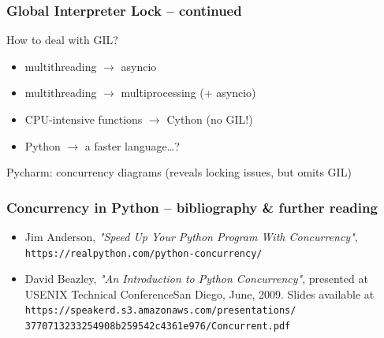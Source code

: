 \documentclass{beamer}
\begin{document}
    \begin{frame}
        \frametitle{Global Interpreter Lock -- continued}

        How to deal with GIL?
        \begin{itemize}
            \item multithreading $\rightarrow$ asyncio
            \item multithreading $\rightarrow$ multiprocessing (+ asyncio)
            \item CPU-intensive functions $\rightarrow$ Cython (no GIL!)
            \item Python $\rightarrow$ a faster language\dots?
        \end{itemize}

        Pycharm: concurrency diagrams (reveals locking issues, but omits GIL)

    \end{frame}


    \begin{frame}
        \frametitle{Concurrency in Python -- bibliography \& further reading}

        \begin{itemize}
            \item<1-> Jim Anderson, \emph{"Speed Up Your Python Program With Concurrency"},
            \texttt{https://realpython.com/python-concurrency/}
            \item<1-> David Beazley, \emph{"An Introduction to Python Concurrency"},
                presented at USENIX Technical ConferenceSan Diego, June, 2009.
                Slides available at \texttt{https://speakerd.s3.amazonaws.com/presentations/
            3770713233254908b259542c4361e976/Concurrent.pdf}
        \end{itemize}
    \end{frame}
\end{document}
